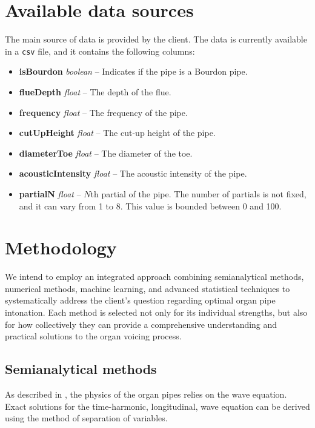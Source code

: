 \documentclass{psu-report}
\begin{document}
\section{Available data sources}

The main source of data is provided by the client.
The data is currently available in a \texttt{csv} file, and it contains the
following columns:
\begin{itemize}
    \item \textbf{isBourdon} \textit{boolean} -- Indicates if the pipe is a Bourdon pipe.
    \item \textbf{flueDepth} \textit{float} -- The depth of the flue.
    \item \textbf{frequency} \textit{float} -- The frequency of the pipe.
    \item \textbf{cutUpHeight} \textit{float} -- The cut-up height of the pipe.
    \item \textbf{diameterToe} \textit{float} -- The diameter of the toe.
    \item \textbf{acousticIntensity} \textit{float} -- The acoustic intensity of the pipe.
    \item \textbf{partialN} \textit{float} -- \(N\)th partial of the pipe.
        The number of partials is not fixed, and it can vary from 1 to 8.
        This value is bounded between 0 and 100.
\end{itemize}

\section{Methodology}

We intend to employ an integrated approach combining semianalytical methods, numerical methods, machine learning, 
and advanced statistical techniques to systematically address the client's question regarding optimal organ 
pipe intonation.
Each method is selected not only for its individual strengths, but also for how collectively they can provide 
a comprehensive understanding and practical solutions to the organ voicing process.

\subsection{Semianalytical methods}

As described in \autocite{2004RosFle-1}, the physics of the organ pipes relies
on the wave equation.
Exact solutions for the time-harmonic, longitudinal, wave equation can be
derived using the method of separation of variables.
\end{document}
